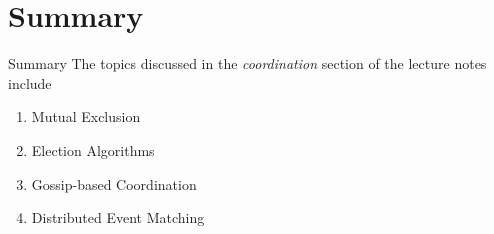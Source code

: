 \section{Summary}
\begin{slide}{Summary}
The topics discussed in the \emph{coordination} section 
of the lecture notes include
\begin{enumerate}
  \item Mutual Exclusion
  \item Election Algorithms
  \item Gossip-based Coordination
  \item Distributed Event Matching
\end{enumerate}
\end{slide}
